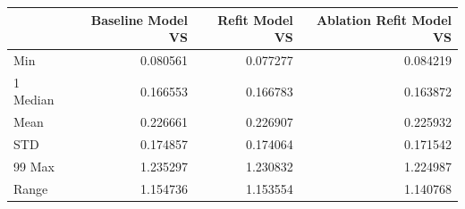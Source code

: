 \begin{tabular}{lrrr}
\toprule
 & Baseline Model VS & Refit Model VS & Ablation Refit Model VS \\
\midrule
Min & 0.080561 & 0.077277 & 0.084219 \\
1%
Median & 0.166553 & 0.166783 & 0.163872 \\
Mean & 0.226661 & 0.226907 & 0.225932 \\
STD & 0.174857 & 0.174064 & 0.171542 \\
99%
Max & 1.235297 & 1.230832 & 1.224987 \\
Range & 1.154736 & 1.153554 & 1.140768 \\
\bottomrule
\end{tabular}
